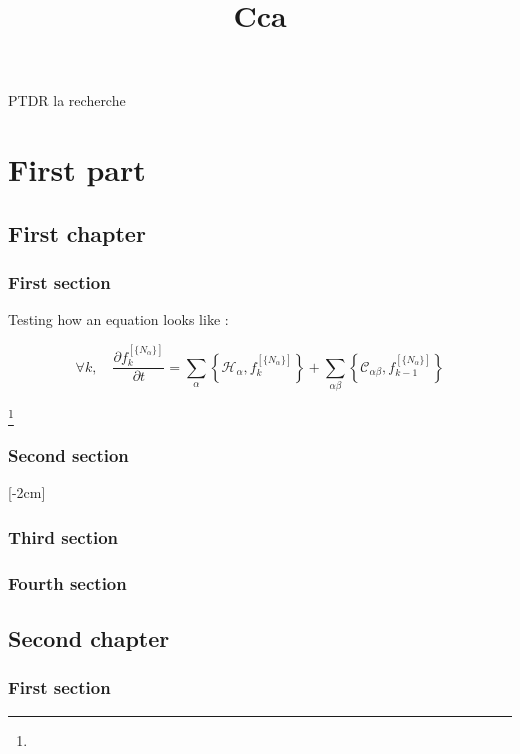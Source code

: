 \documentclass{researchbook}
\title{Cca}
\begin{document}
\maketitle
\newpage

PTDR la recherche

\tableofcontents


\part{First part}
\chapter{First chapter}

\section{First section}

Testing how an equation looks like : 

\[
\forall k, \quad \frac{\partial f^{[\{N_\alpha\}]}_{k}}{\partial t} = \sum_\alpha\left\{\mathcal{H}_\alpha, f^{[\{N_\alpha\}]}_k\right\} + \sum_{\alpha\beta} \left\{\mathcal{C}_{\alpha\beta}, f^{[\{N_\alpha\}]}_{k-1}\right\}
\]
\lipsum

\footnote{\lipsum}

\section{Second section}\lipsum
\reversemarginpar{}[-2cm]
\section{Third section}\lipsum
\section{Fourth section}\lipsum

\chapter{Second chapter}

\section{First section}\lipsum
\end{document}
